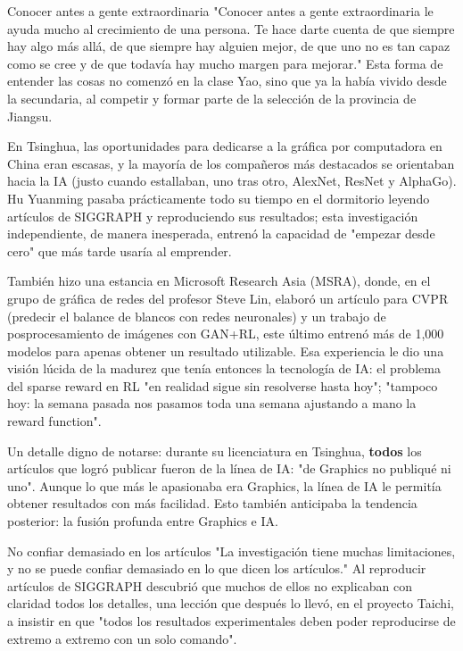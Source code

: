 \begin{importantbox}{Conocer antes a gente extraordinaria}
"Conocer antes a gente extraordinaria le ayuda mucho al crecimiento de una persona. Te hace darte cuenta de que siempre hay algo más allá, de que siempre hay alguien mejor, de que uno no es tan capaz como se cree y de que todavía hay mucho margen para mejorar." Esta forma de entender las cosas no comenzó en la clase Yao, sino que ya la había vivido desde la secundaria, al competir y formar parte de la selección de la provincia de Jiangsu.
\end{importantbox}

En Tsinghua, las oportunidades para dedicarse a la gráfica por computadora en China eran escasas, y la mayoría de los compañeros más destacados se orientaban hacia la IA (justo cuando estallaban, uno tras otro, AlexNet, ResNet y AlphaGo). Hu Yuanming pasaba prácticamente todo su tiempo en el dormitorio leyendo artículos de SIGGRAPH y reproduciendo sus resultados; esta investigación independiente, de manera inesperada, entrenó la capacidad de "empezar desde cero" que más tarde usaría al emprender.

También hizo una estancia en Microsoft Research Asia (MSRA), donde, en el grupo de gráfica de redes del profesor Steve Lin, elaboró un artículo para CVPR (predecir el balance de blancos con redes neuronales) y un trabajo de posprocesamiento de imágenes con GAN+RL, este último entrenó más de 1,000 modelos para apenas obtener un resultado utilizable. Esa experiencia le dio una visión lúcida de la madurez que tenía entonces la tecnología de IA: el problema del sparse reward en RL "en realidad sigue sin resolverse hasta hoy"; "tampoco hoy: la semana pasada nos pasamos toda una semana ajustando a mano la reward function".

Un detalle digno de notarse: durante su licenciatura en Tsinghua, \textbf{todos} los artículos que logró publicar fueron de la línea de IA: "de Graphics no publiqué ni uno". Aunque lo que más le apasionaba era Graphics, la línea de IA le permitía obtener resultados con más facilidad. Esto también anticipaba la tendencia posterior: la fusión profunda entre Graphics e IA.

\begin{warningbox}{No confiar demasiado en los artículos}
"La investigación tiene muchas limitaciones, y no se puede confiar demasiado en lo que dicen los artículos." Al reproducir artículos de SIGGRAPH descubrió que muchos de ellos no explicaban con claridad todos los detalles, una lección que después lo llevó, en el proyecto Taichi, a insistir en que "todos los resultados experimentales deben poder reproducirse de extremo a extremo con un solo comando".
\end{warningbox}

